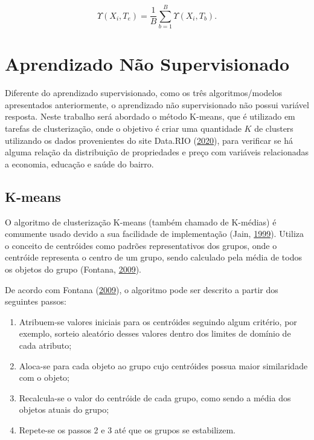 \documentclass[
	12pt,				%
	a4paper,		%
	oneside,    %
	chapter=TITLE,		   %
	section=TITLE,		   %
	subsection=TITLE,	   %
	subsubsection=TITLE, %
	english,			%
	french,				%
	spanish,			%
	brazil,				%
]{abntex2}
\begin{document}
\[
\Upsilon(X_i, T_e) = \frac{1}{B} \sum^{B}_{b=1}\Upsilon(X_i, T_b). 
\]

\hypertarget{aprendizado-nuxe3o-supervisionado}{%
\section{Aprendizado Não
Supervisionado}\label{aprendizado-nuxe3o-supervisionado}}

Diferente do aprendizado supervisionado, como os três algoritmos/modelos
apresentados anteriormente, o aprendizado não supervisionado não possui
variável resposta. Neste trabalho será abordado o método K-means, que é
utilizado em tarefas de clusterização, onde o objetivo é criar uma
quantidade \(K\) de clusters utilizando os dados provenientes do site
Data.RIO (\protect\hyperlink{ref-datario}{2020}), para verificar se há
alguma relação da distribuição de propriedades e preço com variáveis
relacionadas a economia, educação e saúde do bairro.

\hypertarget{k-means}{%
\subsection{K-means}\label{k-means}}

O algoritmo de clusterização K-means (também chamado de K-médias) é
comumente usado devido a sua facilidade de implementação (Jain,
\protect\hyperlink{ref-jain1999data}{1999}). Utiliza o conceito de
centróides como padrões representativos dos grupos, onde o centróide
representa o centro de um grupo, sendo calculado pela média de todos os
objetos do grupo (Fontana, \protect\hyperlink{ref-fontanaestudo}{2009}).

De acordo com Fontana (\protect\hyperlink{ref-fontanaestudo}{2009}), o
algoritmo pode ser descrito a partir dos seguintes passos:

\begin{enumerate}
\def\labelenumi{\arabic{enumi}.}
\item
  Atribuem-se valores iniciais para os centróides seguindo algum
  critério, por exemplo, sorteio aleatório desses valores dentro dos
  limites de domínio de cada atributo;
\item
  Aloca-se para cada objeto ao grupo cujo centróides possua maior
  similaridade com o objeto;
\item
  Recalcula-se o valor do centróide de cada grupo, como sendo a média
  dos objetos atuais do grupo;
\item
  Repete-se os passos 2 e 3 até que os grupos se estabilizem.
\end{enumerate}
\end{document}
